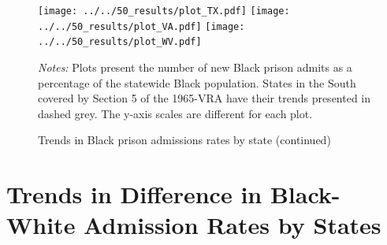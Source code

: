 \documentclass[12pt]{article}
\begin{document}
 \begin{figure}[h!]
 	\begin{center}
 	\caption{Trends in Black prison admissions rates by state (continued)}
 	\small

 		\vspace{.2in}

 			\texttt{[image: ../../50\_results/plot\_TX.pdf]}
 			\texttt{[image: ../../50\_results/plot\_VA.pdf]}
       \texttt{[image: ../../50\_results/plot\_WV.pdf]} \\
 	\label{figure_states2}
 	\end{center}
   {\scriptsize{\emph{Notes:} Plots present the number of new Black prison admits as a percentage of the statewide Black population.  States in the South covered by Section 5 of the 1965-VRA have their trends presented in dashed grey.  The y-axis scales are different for each plot.}}
 \end{figure} \normalsize











 \clearpage \newpage
 \section{Trends in Difference in Black-White Admission Rates by States}\label{appendix_diff_rates_states}
 \setcounter{table}{0}
 \setcounter{figure}{0}
 \renewcommand{\thetable}{D\arabic{table}}
 \renewcommand{\thefigure}{D\arabic{figure}}
 \normalsize
\end{document}
